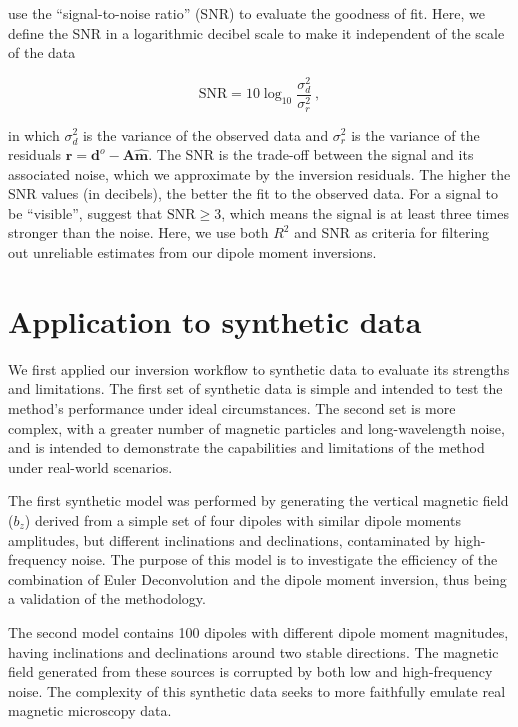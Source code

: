 \citet{CortesOrtuno2021} use the ``signal-to-noise ratio'' (SNR) to evaluate the goodness of fit.
Here, we define the SNR in a logarithmic decibel scale to make it independent of the scale of the data

\begin{equation}
\label{eq_snr}
\text{SNR} = 10 \log_{10}\dfrac{\sigma^2_d}{\sigma^2_r}\ ,
\end{equation}

\noindent
in which $\sigma^2_d$ is the variance of the observed data and $\sigma^2_r$ is the variance of the residuals $\mathbf{r} = \mathbf{d}^o - \mathbf{A}\hat{\mathbf{m}}$.
The SNR is the trade-off between the signal and its associated noise, which we approximate by the inversion residuals.
The higher the SNR values (in decibels), the better the fit to the observed data.
For a signal to be ``visible'', \citet{Strum2014} suggest that $\text{SNR} \ge 3$, which means the signal is at least three times stronger than the noise.
Here, we use both $R^2$ and SNR as criteria for filtering out unreliable estimates from our dipole moment inversions.


\section{Application to synthetic data}

We first applied our inversion workflow to synthetic data to evaluate its strengths and limitations.
The first set of synthetic data is simple and intended to test the method's performance under ideal circumstances.
The second set is more complex, with a greater number of magnetic particles and long-wavelength noise, and is intended to demonstrate the capabilities and limitations of the method under real-world scenarios.

The first synthetic model was performed by generating the vertical magnetic field ($b_z$) derived from a simple set of four dipoles with similar dipole moments amplitudes, but different inclinations and declinations, contaminated by high-frequency noise.
The purpose of this model is to investigate the efficiency of the combination of Euler Deconvolution and the dipole moment inversion, thus being a validation of the methodology.

The second model contains 100 dipoles with different dipole moment magnitudes, having inclinations and declinations around two stable directions.
The magnetic field generated from these sources is corrupted by both low and high-frequency noise.
The complexity of this synthetic data seeks to more faithfully emulate real magnetic microscopy data.


